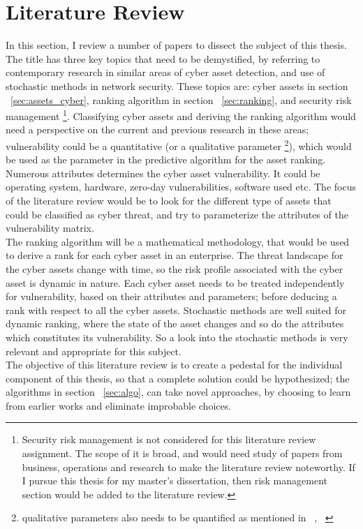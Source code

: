 \section{Literature Review}\label{sec:literature_review}
In this section, I review a number of papers to dissect the subject of this thesis. The title has three key topics that need to be demystified, by referring to contemporary research in similar areas of cyber asset detection, and use of stochastic methods in network security. These topics are: cyber assets in section ~\ref{sec:assets_cyber}, ranking algorithm in section ~\ref{sec:ranking}, and security risk management \footnote{Security risk management is not considered for this literature review assignment. The scope of it is broad, and would need study of papers from business, operations and research to make the literature review noteworthy. If I pursue this thesis for my master's dissertation, then risk management section would be added to the literature review.}.
Classifying cyber assets and deriving the ranking algorithm would need a perspective on the current and previous research in these areas; vulnerability could be a quantitative (or a qualitative parameter \footnote{qualitative parameters also needs to be quantified as mentioned in ~\cite{7546222}, ~\cite{6954232}}), which would be used as the parameter in the predictive algorithm for the asset ranking. Numerous attributes determines the cyber asset vulnerability. It could be operating system, hardware, zero-day vulnerabilities, software used etc. The focus of the literature review would be to look for the different type of assets that could be classified as cyber threat, and try to parameterize the attributes of the vulnerability matrix.\\
The ranking algorithm will be a mathematical methodology, that would be used to derive a rank for each cyber asset in an enterprise. The threat landscape for the cyber assets change with time, so the risk profile associated with the cyber asset is dynamic in nature. Each cyber asset needs to be treated independently for vulnerability, based on their attributes and parameters; before deducing a rank with respect to all the cyber assets. Stochastic methods are well suited for dynamic ranking, where the state of the asset changes and so do the attributes which constitutes its vulnerability. So a look into the stochastic methods is very relevant and appropriate for this subject. \\
The objective of this literature review is to create a pedestal for the individual component of this thesis, so that a complete solution could be hypothesized; the algorithms in section ~\ref{sec:algo}, can take novel approaches, by choosing to learn from earlier works and eliminate improbable choices. \\ 

